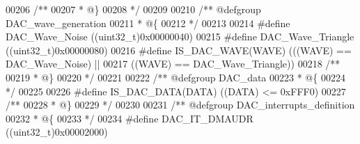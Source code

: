 \begin{DoxyCode}
00206 \textcolor{comment}{/**}
00207 \textcolor{comment}{  * @\}}
00208 \textcolor{comment}{  */}
00209 
00210 \textcolor{comment}{/** @defgroup DAC\_wave\_generation }
00211 \textcolor{comment}{  * @\{}
00212 \textcolor{comment}{  */}
00213 
00214 \textcolor{preprocessor}{#}\textcolor{preprocessor}{define} \textcolor{preprocessor}{DAC\_Wave\_Noise}                     \textcolor{preprocessor}{(}\textcolor{preprocessor}{(}\textcolor{preprocessor}{uint32\_t}\textcolor{preprocessor}{)}0x00000040\textcolor{preprocessor}{)}
00215 \textcolor{preprocessor}{#}\textcolor{preprocessor}{define} \textcolor{preprocessor}{DAC\_Wave\_Triangle}                  \textcolor{preprocessor}{(}\textcolor{preprocessor}{(}\textcolor{preprocessor}{uint32\_t}\textcolor{preprocessor}{)}0x00000080\textcolor{preprocessor}{)}
00216 \textcolor{preprocessor}{#}\textcolor{preprocessor}{define} \textcolor{preprocessor}{IS\_DAC\_WAVE}\textcolor{preprocessor}{(}\textcolor{preprocessor}{WAVE}\textcolor{preprocessor}{)} \textcolor{preprocessor}{(}\textcolor{preprocessor}{(}\textcolor{preprocessor}{(}\textcolor{preprocessor}{WAVE}\textcolor{preprocessor}{)} \textcolor{preprocessor}{==} DAC_Wave_Noise\textcolor{preprocessor}{)} \textcolor{preprocessor}{||}
00217                            \textcolor{preprocessor}{(}\textcolor{preprocessor}{(}\textcolor{preprocessor}{WAVE}\textcolor{preprocessor}{)} \textcolor{preprocessor}{==} DAC_Wave_Triangle\textcolor{preprocessor}{)}\textcolor{preprocessor}{)}
00218 \textcolor{comment}{/**}
00219 \textcolor{comment}{  * @\}}
00220 \textcolor{comment}{  */}
00221 
00222 \textcolor{comment}{/** @defgroup DAC\_data }
00223 \textcolor{comment}{  * @\{}
00224 \textcolor{comment}{  */}
00225 
00226 \textcolor{preprocessor}{#}\textcolor{preprocessor}{define} \textcolor{preprocessor}{IS\_DAC\_DATA}\textcolor{preprocessor}{(}\textcolor{preprocessor}{DATA}\textcolor{preprocessor}{)} \textcolor{preprocessor}{(}\textcolor{preprocessor}{(}\textcolor{preprocessor}{DATA}\textcolor{preprocessor}{)} \textcolor{preprocessor}{<=} 0xFFF0\textcolor{preprocessor}{)}
00227 \textcolor{comment}{/**}
00228 \textcolor{comment}{  * @\}}
00229 \textcolor{comment}{  */}
00230 
00231 \textcolor{comment}{/** @defgroup DAC\_interrupts\_definition }
00232 \textcolor{comment}{  * @\{}
00233 \textcolor{comment}{  */}
00234 \textcolor{preprocessor}{#}\textcolor{preprocessor}{define} \textcolor{preprocessor}{DAC\_IT\_DMAUDR}                      \textcolor{preprocessor}{(}\textcolor{preprocessor}{(}\textcolor{preprocessor}{uint32\_t}\textcolor{preprocessor}{)}0x00002000\textcolor{preprocessor}{)}

\end{DoxyCode}
